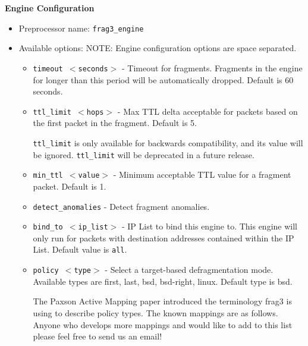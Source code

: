 \documentclass[english]{report}
\newenvironment{note}{
\samepage
    \vspace{10pt}{\textsf{
        {\hspace{7pt}\Huge{$\triangle$\hspace{-12.5pt}{\Large{$^!$}}}}\hspace{5pt}
        {\Large{NOTE}}
    }
    }
   \begin{center}
    \par\vspace{-17pt}

    \begin{lrbox}{\savepar}
    \begin{minipage}[r]{6in}
}
{
    \end{minipage}
    \end{lrbox}
    \fbox{
        \usebox{
            \savepar
	}
    }
    \par\vskip10pt
    \end{center}
}
\newenvironment{note}{
        \begin{rawhtml}
        <p><table border="1"><tr><td><b>
        Note:&nbsp;&nbsp;</b>
        \end{rawhtml}
}{
        \begin{rawhtml}
        </b></td></tr></table></p>
        \end{rawhtml}
}
\begin{document}
\textbf{Engine Configuration}
\begin{itemize}
\item Preprocessor name: \texttt{frag3\_engine}
\item Available options:
  NOTE: Engine configuration options are space separated.
  \begin{itemize}
  \item   \texttt{timeout $<$seconds$>$} - Timeout for fragments.  Fragments in the engine for 
                         longer than this period will be automatically dropped.
                         Default is 60 seconds.
                         
  \item   \texttt{ttl\_limit $<$hops$>$} - Max TTL delta acceptable for packets based on the first
                        packet in the fragment.  Default is 5.
\begin{note}
\texttt{ttl\_limit} is only available for backwards compatibility,
and its value will be ignored.  \texttt{ttl\_limit} will be deprecated
in a future release.
\end{note}

                        
  \item   \texttt{min\_ttl $<$value$>$} - Minimum acceptable TTL value for a fragment packet.  
                       Default is 1.
                       
  \item  \texttt{detect\_anomalies} - Detect fragment anomalies.
     
   \item  \texttt{bind\_to $<$ip\_list$>$} - IP List to bind this engine to.  This engine will only
                         run for packets with destination addresses contained
                         within the IP List.  Default value is \texttt{all}.
                         
   \item \texttt{policy $<$type$>$} - Select a target-based defragmentation mode.  Available 
                     types are first, last, bsd, bsd-right, linux.  Default
                     type is bsd.

                     The Paxson Active Mapping paper introduced the terminology
                     frag3 is using to describe policy types.  The known 
                     mappings are as follows.  Anyone who develops more 
                     mappings and would like to add to this list please feel
                     free to send us an email!
                     

\end{itemize}
\end{itemize}
\end{document}

